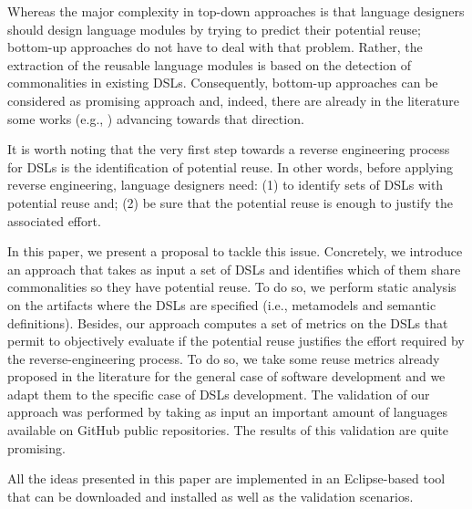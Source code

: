 Whereas the major complexity in top-down approaches is that language designers should design language modules by trying to predict their potential reuse; bottom-up approaches do not have to deal with that problem. Rather, the extraction of the reusable language modules is based on the detection of commonalities in existing DSLs. Consequently, bottom-up approaches can be considered as promising approach and, indeed, there are already in the literature some works (e.g., \cite{vacchi:2014}) advancing towards that direction. 

It is worth noting that the very first step towards a reverse engineering process for DSLs is the identification of potential reuse. In other words, before applying reverse engineering, language designers need: (1) to identify sets of DSLs with potential reuse and; (2) be sure that the potential reuse is enough to justify the associated effort.

In this paper, we present a proposal to tackle this issue. Concretely, we introduce an approach that takes as input a set of DSLs and identifies which of them share commonalities so they have potential reuse. To do so, we perform static analysis on the artifacts where the DSLs are specified (i.e., metamodels and semantic definitions). Besides, our approach computes a set of metrics on the DSLs that permit to objectively evaluate if the potential reuse justifies the effort required by the reverse-engineering process. To do so, we take some reuse metrics already proposed in the literature for the general case of software development \cite{Berger:2014,Berger:126283} and we adapt them to the specific case of DSLs development. The validation of our approach was performed by taking as input an important amount of languages available on GitHub public repositories. The results of this validation are quite promising.

All the ideas presented in this paper are implemented in an Eclipse-based tool that can be downloaded and installed as well as the validation scenarios. 


